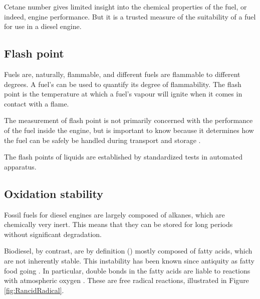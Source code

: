 Cetane number gives limited insight into the chemical properties of the fuel, or
indeed, engine performance. But it is a trusted measure of the suitability of a
fuel for use in a diesel engine. 

\subsection{Flash point}

Fuels are, naturally, flammable, and different fuels are flammable to different
degrees. A fuel's  can be used to quantify its degree of
flammability. The flash point is the temperature at which a fuel's vapour will
ignite when it comes in contact with a flame. 

The measurement of flash point is not primarily concerned with the performance
of the fuel inside the engine, but is important to know because it determines
how the fuel can be safely be handled during transport and storage
\autocite{WFCC2009}.

The flash points of liquids are established by standardized tests in automated
apparatus.

\subsection{Oxidation stability}
\label{sec:Rancimat}

Fossil fuels for diesel engines are largely composed of alkanes, which are
chemically very inert. This means that they can be stored for long periods
without significant degradation.

Biodiesel, by contrast, are by definition (\autocite[Paragraph 4.1.1]{SANS1935})
mostly composed of fatty acids, which are not inherently stable.
This instability has been known since antiquity as fatty food going
. In particular, double bonds in the fatty acids are liable to
reactions with atmospheric oxygen \autocite{Velasco2010}. These are free radical
reactions, illustrated in Figure \ref{fig:RancidRadical}.

